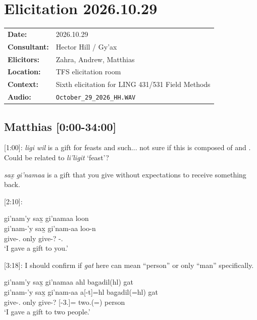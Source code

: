 \renewcommand{\ElicitationDate}{2026.10.29}

\section{Elicitation \ElicitationDate}

\begin{tabular}{ll}
\textbf{Date:} & \ElicitationDate \\
\textbf{Consultant:} & Hector Hill / Gy'ax \\
\textbf{Elicitors:} & Zahra, Andrew, Matthias \\
\textbf{Location:} & TFS elicitation room \\
\textbf{Context:} & Sixth elicitation for LING 431/531 Field Methods \\
\textbf{Audio:} & \texttt{October\_29\_2026\_HH.WAV} \\
\end{tabular}

\subsection{Matthias [0:00-34:00]}

[1:00]: \textit{ligi wil} is a gift for feasts and such... not sure if this is composed of \Dwid{} and \Comp{}. Could be related to \textit{li'ligit} `feast'?

\textit{sax̱ gi'namaa} is a gift that you give without expectations to receive something back. 

[2:10]:

\begin{exe}
    \ex \glll gi'nam'y sax̱ gi'namaa loon \\
    gi'nam-'y sax̱ gi'nam-aa loo-n  \\
    give-\Fsg{}.\Ii{} only give-\Nmlz{}? \Obl{}-\Ssg{}.\Ii{} \\
    `I gave a gift to you.'
\end{exe}

[3:18]: I should confirm if \textit{gat} here can mean ``person'' or only ``man'' specifically.

\begin{exe}
    \ex \glll gi'nam'y sax̱ gi'namaa ahl bag̱adil(hl) gat \\
    gi'nam-'y sax̱ gi'nam-aa a[-t]=hl bag̱adil(=hl) gat \\
    give-\Fsg{}.\Ii{} only give-\Nmlz{}? \Prep{}[-3.\Ii{}]=\Cn{} two.\Hum{}(=\Cn{}) person \\
    `I gave a gift to two people.'
\end{exe}

